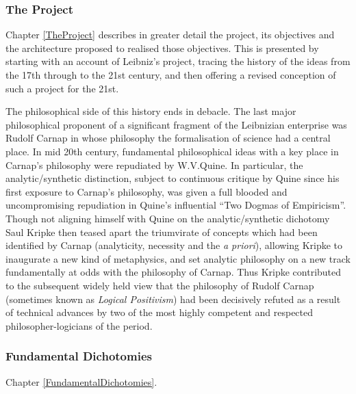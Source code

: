 \subsubsection{The Project}

Chapter \ref{TheProject} describes in greater detail the project,
its objectives and the architecture proposed to realised those objectives.
This is presented by starting with an account of Leibniz's project,
tracing the history of the ideas from the 17th through to the
21st century, and then offering a revised conception of such a
project for the 21st.

The philosophical side of this history ends in debacle.
The last major philosophical proponent of a significant fragment of
the Leibnizian enterprise was Rudolf Carnap in whose philosophy the
formalisation of science had a central place.
In mid 20th century, fundamental philosophical ideas with a key
place in Carnap's philosophy were repudiated by W.V.Quine.
In particular, the analytic/synthetic distinction, subject to
continuous critique by Quine since his first exposure to Carnap's
philosophy, was given a full blooded and uncompromising repudiation in
Quine's influential ``Two Dogmas of Empiricism''.
Though not aligning himself with Quine on the analytic/synthetic
dichotomy Saul Kripke then teased apart the triumvirate of concepts
which had been identified by Carnap (analyticity, necessity and the
{\it a priori}), allowing Kripke to inaugurate a new kind of
metaphysics, and set analytic philosophy on a new track fundamentally
at odds with the philosophy of Carnap.
Thus Kripke contributed to the subsequent widely held view that the
philosophy of Rudolf Carnap (sometimes known as {\it Logical
  Positivism}) had been decisively refuted as a result of technical
advances by two of the most highly competent and respected
philosopher-logicians of the period.

\subsubsection{Fundamental Dichotomies}

Chapter \ref{FundamentalDichotomies}.

